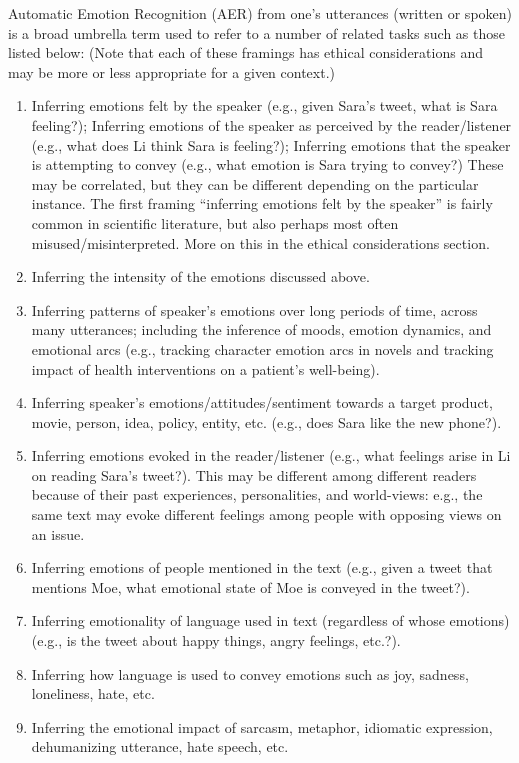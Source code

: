 \documentclass{clv3}
\begin{document}
Automatic Emotion Recognition (AER) from one’s utterances (written or spoken) is a broad umbrella term used to refer to a number of related tasks such as those listed below: (Note that each of these framings has ethical considerations and may be more or less appropriate for a given context.)\\[-20pt]
\begin{enumerate}
    \item Inferring emotions felt by the speaker (e.g., given Sara’s tweet, what is Sara feeling?); 
Inferring emotions of the speaker as perceived by the reader/listener (e.g., what does Li think Sara is feeling?); 
Inferring emotions that the speaker is attempting to convey (e.g., what emotion is Sara trying to convey?)
These may be correlated, but they can be different depending on the particular instance. The first framing “inferring emotions felt by the speaker” is fairly common in scientific literature, but also perhaps most often misused/misinterpreted. More on this in the ethical considerations section.
\vspace*{-1mm}
\item Inferring the intensity of the emotions discussed above.
\vspace*{-1mm}
\item Inferring patterns of speaker’s emotions over long periods of time, across many utterances; including the inference of moods, emotion dynamics, and emotional arcs (e.g., tracking character emotion arcs in novels and  tracking impact of health interventions on a patient’s well-being).
\vspace*{-1mm}
\item Inferring speaker’s emotions/attitudes/sentiment towards a target product, movie, person, idea, policy, entity, etc. (e.g., does Sara like the new phone?).
\vspace*{-1mm}
\item Inferring emotions evoked in the reader/listener (e.g., what feelings arise in Li on reading Sara’s tweet?).
This may be different among different readers because of their past experiences, personalities, and world-views: e.g., the same text may evoke different feelings among people with opposing views on an issue.
\vspace*{-1mm}
\item Inferring emotions of people mentioned in the text (e.g., given a tweet that mentions Moe, what emotional state of Moe is conveyed in the tweet?).
\vspace*{-1mm}
\item Inferring emotionality of language used in text (regardless of whose emotions) (e.g., is the tweet about happy things, angry feelings, etc.?).
\vspace*{-1mm}
\item Inferring how language is used to convey emotions such as joy, sadness, loneliness, hate, etc. %
\vspace*{-1mm}
\item Inferring the emotional impact of sarcasm, metaphor, idiomatic expression, dehumanizing utterance, hate speech, etc. %
\end{enumerate}
\end{document}
